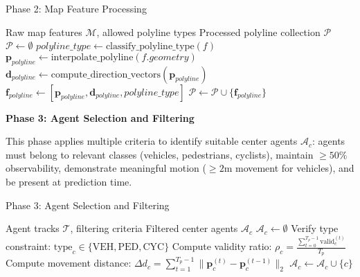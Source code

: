 \begin{algorithm}[H]
\caption{Phase 2: Map Feature Processing}
\label{alg:phase2_map}
\begin{algorithmic}[1]
\REQUIRE Raw map features $\mathcal{M}$, allowed polyline types
\ENSURE Processed polyline collection $\mathcal{P}$
\STATE $\mathcal{P} \leftarrow \emptyset$ 
    \STATE $polyline\_type \leftarrow \text{classify\_polyline\_type}(f)$
        \STATE $\boldsymbol{p}_{polyline} \leftarrow \text{interpolate\_polyline}(f.geometry)$
        \STATE $\boldsymbol{d}_{polyline} \leftarrow \text{compute\_direction\_vectors}(\boldsymbol{p}_{polyline})$
        \STATE $\boldsymbol{f}_{polyline} \leftarrow [\boldsymbol{p}_{polyline}, \boldsymbol{d}_{polyline}, polyline\_type]$
        \STATE $\mathcal{P} \leftarrow \mathcal{P} \cup \{\boldsymbol{f}_{polyline}\}$
    \ENDIF
\ENDFOR
\end{algorithmic}
\end{algorithm}

\textbf{Phase 3: Agent Selection and Filtering}

This phase applies multiple criteria to identify suitable center agents $\mathcal{A}_{c}$: agents must belong to relevant classes (vehicles, pedestrians, cyclists), maintain $\geq 50\%$ observability, demonstrate meaningful motion ($\geq 2$m movement for vehicles), and be present at prediction time.

\begin{algorithm}[H]
\caption{Phase 3: Agent Selection and Filtering}
\label{alg:phase3_filtering}
\begin{algorithmic}[1]
\REQUIRE Agent tracks $\mathcal{T}$, filtering criteria
\ENSURE Filtered center agents $\mathcal{A}_{c}$
\STATE $\mathcal{A}_{c} \leftarrow \emptyset$
    \STATE Verify type constraint: $\text{type}_{c} \in \{\text{VEH}, \text{PED}, \text{CYC}\}$
    \STATE Compute validity ratio: $\rho_c = \frac{\sum_{t=0}^{T_p-1} \text{valid}_c^{(t)}}{T_p}$
    \STATE Compute movement distance: $\Delta d_c = \sum_{t=1}^{T_p-1} \|\boldsymbol{p}_c^{(t)} - \boldsymbol{p}_c^{(t-1)}\|_2$
        \STATE $\mathcal{A}_{c} \leftarrow \mathcal{A}_{c} \cup \{c\}$
    \ENDIF
\ENDFOR
\end{algorithmic}
\end{algorithm}

